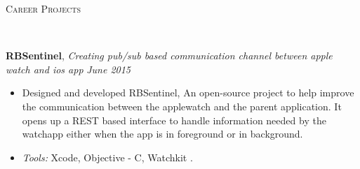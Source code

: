 \documentclass[9pt]{article}
\newenvironment{changemargin}[2]{%
  \begin{list}{}{%
    \setlength{\topsep}{0pt}%
    \setlength{\leftmargin}{#1}%
    \setlength{\rightmargin}{#2}%
    \setlength{\listparindent}{\parindent}%
    \setlength{\itemindent}{\parindent}%
    \setlength{\parsep}{\parskip}%
  }%
  \item[]}{\end{list}
}
\newcommand{\lineover}{
	\begin{changemargin}{-0.05in}{-0.05in}
		\vspace*{-8pt}
		\hrulefill \\
		\vspace*{-2pt}
	\end{changemargin}
}
\newcommand{\header}[1]{
	\begin{changemargin}{-0.5in}{-0.5in}
		\scshape{#1}\\
  	\lineover
	\end{changemargin}
}
\newenvironment{body} {
	\vspace*{-16pt}
	\begin{changemargin}{-0.25in}{-0.5in}
  }	
	{\end{changemargin}
}
\begin{document}
\smallskip

\header{Career Projects}

\begin{body}
	\vspace{14pt}
\textbf {RBSentinel}, \emph{Creating pub/sub based communication channel between apple watch and ios app} \hfill \emph{June 2015}\\
	\vspace*{-4pt}
	\begin{itemize} \itemsep -0pt
	\item Designed and developed RBSentinel, An open-source project to help improve the communication between the applewatch and the parent application. It opens up a REST based interface to handle information needed by the watchapp either when the app is in foreground or in background.
	\item \emph{Tools:} Xcode, Objective - C, Watchkit .
\end{itemize}


\end{body}
\end{document}
